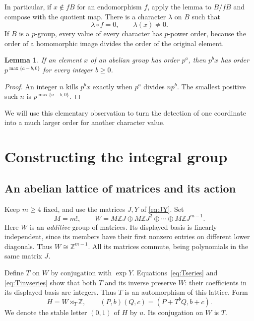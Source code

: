 \documentclass[11pt]{article}
\numberwithin{equation}{section}
\newtheorem{lemma}[theorem]{Lemma}
\theoremstyle{definition}
\theoremstyle{remark}
\newcommand{\Z}{\mathbb Z}
\begin{document}
In particular, if $x\notin fB$ for an endomorphism $f$, apply the lemma to $B/fB$ and compose with the quotient map. There is a character $\lambda$ on $B$ such that
\begin{equation}\label{eq:characterseparation}
\lambda\circ f=0,\qquad \lambda(x)\ne0.
\end{equation}
If $B$ is a $p$-group, every value of every character has $p$-power order, because the order of a homomorphic image divides the order of the original element.

\begin{lemma}\label{lem:order}
If an element $x$ of an abelian group has order $p^a$, then $p^b x$ has order $p^{\max\{a-b,0\}}$ for every integer $b\ge0$.
\end{lemma}
\begin{proof}
An integer $n$ kills $p^b x$ exactly when $p^a$ divides $np^b$. The smallest positive such $n$ is $p^{\max\{a-b,0\}}$.
\end{proof}
We will use this elementary observation to turn the detection of one coordinate into a much larger order for another character value.

\section{Constructing the integral group}\label{sec:construction}
\subsection{An abelian lattice of matrices and its action}
Keep $m\ge4$ fixed, and use the matrices $J,Y$ of \eqref{eq:JY}. Set
\begin{equation}\label{eq:W}
M=m!,\qquad
W=M\Z J\oplus M\Z J^2\oplus\cdots\oplus M\Z J^{m-1}.
\end{equation}
Here $W$ is an \emph{additive} group of matrices. Its displayed basis is linearly independent, since its members have their first nonzero entries on different lower diagonals. Thus $W\cong\Z^{m-1}$. All its matrices commute, being polynomials in the same matrix $J$.

Define $T$ on $W$ by conjugation with $\exp Y$. Equations~\eqref{eq:Tseries} and \eqref{eq:Tinvseries} show that both $T$ and its inverse preserve $W$: their coefficients in its displayed basis are integers. Thus $T$ is an automorphism of this lattice. Form
\begin{equation}\label{eq:H}
H=W\rtimes_T\Z,\qquad
(P,b)(Q,c)=(P+T^bQ,b+c).
\end{equation}
We denote the stable letter $(0,1)$ of $H$ by $u$. Its conjugation on $W$ is $T$.
\end{document}
